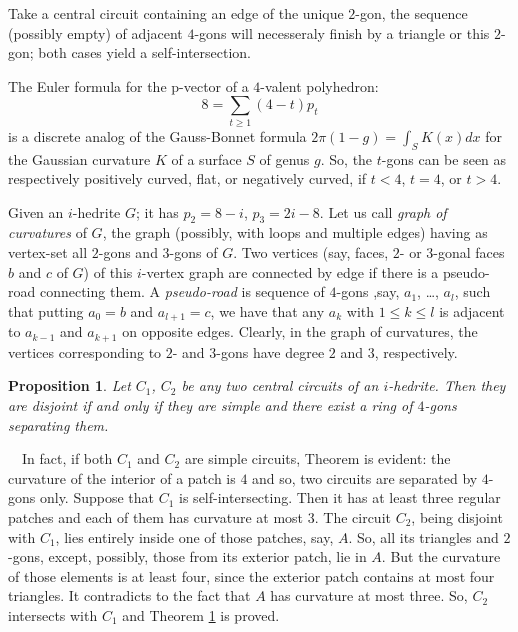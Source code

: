 \documentclass[12pt]{article}
\newtheorem{proposition}{Proposition}
\newcommand{\proof}{\noindent{\bf Proof.}\ \ }
\begin{document}
Take a central circuit containing an edge of the unique $2$-gon, the sequence (possibly empty) of adjacent $4$-gons will necesseraly finish by a triangle or this $2$-gon; both cases yield a self-intersection.






The Euler formula for the p-vector of a $4$-valent polyhedron:
$$8=\sum_{t\geq 1} (4-t)p_t$$
is a discrete analog of the Gauss-Bonnet formula $2\pi(1-g)=\int_{S} K(x)dx$ for the Gaussian curvature $K$ of a surface $S$ of genus $g$. So, the $t$-gons can be seen as respectively positively curved, flat, or negatively curved, if $t<4$, $t=4$, or $t>4$.


Given an $i$-hedrite $G$; it has $p_2=8-i$, $p_3=2i-8$. Let us 
call {\em graph of curvatures} of $G$, the graph (possibly, with loops 
and multiple edges) having as vertex-set all $2$-gons and $3$-gons of $G$. 
Two vertices (say, faces, $2$- or $3$-gonal faces $b$ and $c$ of $G$) of 
this $i$-vertex graph are connected by edge if there is a pseudo-road 
connecting them. A {\em pseudo-road} is sequence of $4$-gons 
,say, $a_1$, \dots, $a_l$, such that putting $a_0=b$ and $a_{l+1}=c$, 
we have that any $a_k$ with $1\leq k\leq l$ is adjacent to $a_{k-1}$ 
and $a_{k+1}$ on opposite edges. Clearly, in the graph of curvatures, 
the vertices corresponding to $2$- and $3$-gons have degree $2$ and $3$, 
respectively.







\begin{proposition}\label{intersec}
Let $C_1$, $C_2$ be any two central circuits of an $i$-hedrite. Then 
they are disjoint if and only if they are simple and there exist a 
ring of $4$-gons separating them.

\end{proposition}
\proof In fact, if both $C_1$ and $C_2$ are simple circuits, Theorem 
is evident: the curvature of the interior of a patch is $4$ and so, two
circuits are separated by $4$-gons only. Suppose that $C_1$ is 
self-intersecting. Then it has at least three regular patches and each 
of them has curvature at most $3$.
The circuit $C_2$, being disjoint with $C_1$, lies entirely inside one 
of those patches, say, $A$. So, all its triangles and $2$-gons, except, 
possibly, those from its exterior patch, lie in $A$. But the curvature 
of those elements is at least four, since the exterior
patch contains at most four triangles. It contradicts to the fact that $A$
has curvature at most three. So, $C_2$ intersects with $C_1$ and 
Theorem \ref{intersec} is proved.
\end{document}
